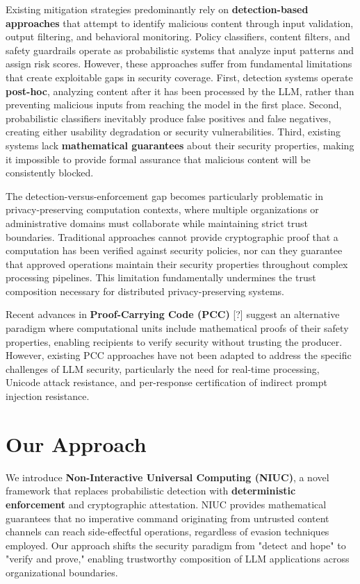 Existing mitigation strategies predominantly rely on \textbf{detection-based approaches} that attempt to identify malicious content through input validation, output filtering, and behavioral monitoring. Policy classifiers, content filters, and safety guardrails operate as probabilistic systems that analyze input patterns and assign risk scores. However, these approaches suffer from fundamental limitations that create exploitable gaps in security coverage. First, detection systems operate \textbf{post-hoc}, analyzing content after it has been processed by the LLM, rather than preventing malicious inputs from reaching the model in the first place. Second, probabilistic classifiers inevitably produce false positives and false negatives, creating either usability degradation or security vulnerabilities. Third, existing systems lack \textbf{mathematical guarantees} about their security properties, making it impossible to provide formal assurance that malicious content will be consistently blocked.

The detection-versus-enforcement gap becomes particularly problematic in privacy-preserving computation contexts, where multiple organizations or administrative domains must collaborate while maintaining strict trust boundaries. Traditional approaches cannot provide cryptographic proof that a computation has been verified against security policies, nor can they guarantee that approved operations maintain their security properties throughout complex processing pipelines. This limitation fundamentally undermines the trust composition necessary for distributed privacy-preserving systems.

Recent advances in \textbf{Proof-Carrying Code (PCC)} [?] suggest an alternative paradigm where computational units include mathematical proofs of their safety properties, enabling recipients to verify security without trusting the producer. However, existing PCC approaches have not been adapted to address the specific challenges of LLM security, particularly the need for real-time processing, Unicode attack resistance, and per-response certification of indirect prompt injection resistance.

\section{Our Approach}

We introduce \textbf{Non-Interactive Universal Computing (NIUC)}, a novel framework that replaces probabilistic detection with \textbf{deterministic enforcement} and cryptographic attestation. NIUC provides mathematical guarantees that no imperative command originating from untrusted content channels can reach side-effectful operations, regardless of evasion techniques employed. Our approach shifts the security paradigm from "detect and hope" to "verify and prove," enabling trustworthy composition of LLM applications across organizational boundaries.


